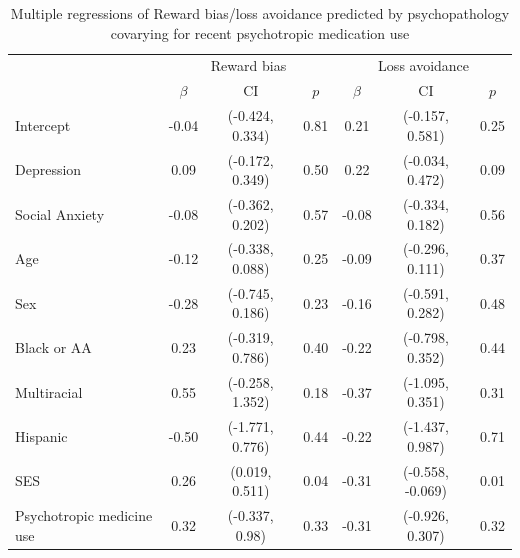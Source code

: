 \documentclass[english,man,floatsintext]{apa6}
\begin{document}
\begin{table}[tbp]
\begin{center}
\begin{threeparttable}
\end{threeparttable}
\end{center}

\end{table}

\begin{table}[tbp]

\begin{center}
\begin{threeparttable}

\caption{\label{tab:unnamed-chunk-9}Multiple regressions of Reward bias/loss avoidance predicted by psychopathology covarying for recent psychotropic medication use}

\begin{tabular}{lcccccc}
\toprule
 \multicolumn{1}{c}{ } & \multicolumn{3}{c}{Reward bias} & \multicolumn{3}{c}{Loss avoidance} \\
\cmidrule(r){1-1} \cmidrule(r){2-4} \cmidrule(r){5-7}
  & $\beta$ & CI & $p$ & $\beta$ & CI & $p$\\
\midrule
Intercept & -0.04 & (-0.424, 0.334) & 0.81 & 0.21 & (-0.157, 0.581) & 0.25\\
Depression & 0.09 & (-0.172, 0.349) & 0.50 & 0.22 & (-0.034, 0.472) & 0.09\\
Social Anxiety & -0.08 & (-0.362, 0.202) & 0.57 & -0.08 & (-0.334, 0.182) & 0.56\\
Age & -0.12 & (-0.338, 0.088) & 0.25 & -0.09 & (-0.296, 0.111) & 0.37\\
Sex & -0.28 & (-0.745, 0.186) & 0.23 & -0.16 & (-0.591, 0.282) & 0.48\\
Black or AA & 0.23 & (-0.319, 0.786) & 0.40 & -0.22 & (-0.798, 0.352) & 0.44\\
Multiracial & 0.55 & (-0.258, 1.352) & 0.18 & -0.37 & (-1.095, 0.351) & 0.31\\
Hispanic & -0.50 & (-1.771, 0.776) & 0.44 & -0.22 & (-1.437, 0.987) & 0.71\\
SES & 0.26 & (0.019, 0.511) & 0.04 & -0.31 & (-0.558, -0.069) & 0.01\\
Psychotropic medicine use & 0.32 & (-0.337, 0.98) & 0.33 & -0.31 & (-0.926, 0.307) & 0.32\\
\bottomrule
\end{tabular}

\end{threeparttable}
\end{center}

\end{table}
\end{document}
